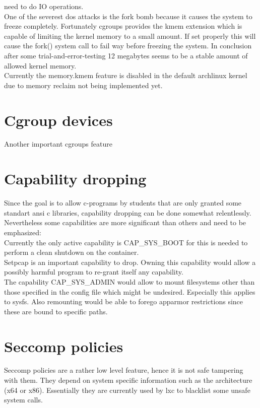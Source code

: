 need to do IO operations.\\
One of the severest dos attacks is the fork bomb because it causes the system to freeze completely. Fortunately cgroups provides
the kmem extension which is capable of limiting the kernel memory to a small amount. If set properly this will cause the fork()
system call to fail way before freezing the system. In conclusion after some trial-and-error-testing 12 megabytes seems to be a
stable amount of allowed kernel memory.\\
Currently the memory.kmem feature is disabled in the default archlinux kernel due to memory reclaim not being implemented yet\cite{kmembug}.

\section{Cgroup devices}

Another important cgroups feature

\section{Capability dropping}

Since the goal is to allow c-programs by students that are only granted some standart ansi c libraries, capability dropping can be
done somewhat relentlessly. Nevertheless some capabilities are more significant than others and need to be emphasized:\\
Currently the only active capability is CAP\_SYS\_BOOT for this is needed to perform a clean shutdown on the container.\\
Setpcap is an important capability to drop. Owning this capability would allow a possibly harmful program to re-grant itself any
capability\cite{kernelcaps}.\\
The capability CAP\_SYS\_ADMIN would allow to mount filesystems other than those specified in the config file which might be undesired.
Especially this applies to sysfs. Also remounting would be able to forego apparmor restrictions since these are bound to specific paths.\\


\section{Seccomp policies}

Seccomp policies are a rather low level feature, hence it is not safe tampering with them. They depend on system specific information such
as the architecture (x64 or x86). Essentially they are currently used by lxc to blacklist some unsafe system calls.